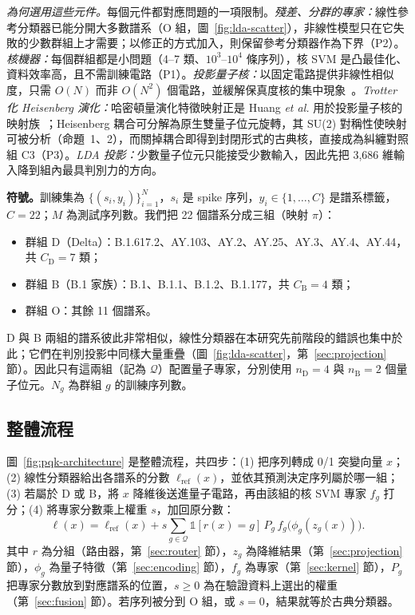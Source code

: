 \documentclass[10pt,a4paper]{article}
\begin{document}
\textit{為何選用這些元件。}每個元件都對應問題的一項限制。\emph{殘差、分群的專家：}線性參考分類器已能分開大多數譜系（O 組，圖~\ref{fig:lda-scatter}），非線性模型只在它失敗的少數群組上才需要；以修正的方式加入，則保留參考分類器作為下界（P2）。\emph{核機器：}每個群組都是小問題（4--7 類、$10^3$--$10^4$ 條序列），核 SVM 是凸最佳化、資料效率高，且不需訓練電路（P1）。\emph{投影量子核：}以固定電路提供非線性相似度，只需 $O(N)$ 而非 $O(N^2)$ 個電路，並緩解保真度核的集中現象~\cite{huang2021power}。\emph{Trotter 化 Heisenberg 演化：}哈密頓量演化特徵映射正是 Huang \textit{et al.} 用於投影量子核的映射族~\cite{huang2021power}；Heisenberg 耦合可分解為原生雙量子位元旋轉，其 SU(2) 對稱性使映射可被分析（命題~1、2），而關掉耦合即得到封閉形式的古典核，直接成為糾纏對照組 C3（P3）。\emph{LDA 投影：}少數量子位元只能接受少數輸入，因此先把 3,686 維輸入降到組內最具判別力的方向。

\textbf{符號。}訓練集為 $\{(s_i,y_i)\}_{i=1}^{N}$，$s_i$ 是 spike 序列，$y_i\in\{1,\dots,C\}$ 是譜系標籤，$C=22$；$M$ 為測試序列數。我們把 22 個譜系分成三組（映射 $\pi$）：
\begin{itemize}
    \item 群組 D（Delta）：B.1.617.2、AY.103、AY.2、AY.25、AY.3、AY.4、AY.44，共 $C_{\mathrm{D}}=7$ 類；
    \item 群組 B（B.1 家族）：B.1、B.1.1、B.1.2、B.1.177，共 $C_{\mathrm{B}}=4$ 類；
    \item 群組 O：其餘 11 個譜系。
\end{itemize}
D 與 B 兩組的譜系彼此非常相似，線性分類器在本研究先前階段的錯誤也集中於此；它們在判別投影中同樣大量重疊（圖~\ref{fig:lda-scatter}，第~\ref{sec:projection} 節）。因此只有這兩組（記為 $\mathcal{Q}$）配置量子專家，分別使用 $n_{\mathrm{D}}=4$ 與 $n_{\mathrm{B}}=2$ 個量子位元。$N_g$ 為群組 $g$ 的訓練序列數。

\subsection{整體流程}
\label{sec:architecture}

圖~\ref{fig:pqk-architecture} 是整體流程，共四步：(1) 把序列轉成 0/1 突變向量 $x$；(2) 線性分類器給出各譜系的分數 $\ell_{\mathrm{ref}}(x)$，並依其預測決定序列屬於哪一組；(3) 若屬於 D 或 B，將 $x$ 降維後送進量子電路，再由該組的核 SVM 專家 $f_g$ 打分；(4) 將專家分數乘上權重 $s$，加回原分數：
\begin{equation}
    \ell(x)=\ell_{\mathrm{ref}}(x)
    +s\sum_{g\in\mathcal{Q}}\mathbb{1}[r(x)=g]\,P_g\,f_g\!\big(\phi_g(z_g(x))\big).
    \label{eq:master}
\end{equation}
其中 $r$ 為分組（路由器，第~\ref{sec:router} 節），$z_g$ 為降維結果（第~\ref{sec:projection} 節），$\phi_g$ 為量子特徵（第~\ref{sec:encoding} 節），$f_g$ 為專家（第~\ref{sec:kernel} 節），$P_g$ 把專家分數放到對應譜系的位置，$s\ge0$ 為在驗證資料上選出的權重（第~\ref{sec:fusion} 節）。若序列被分到 O 組，或 $s=0$，結果就等於古典分類器。
\end{document}

